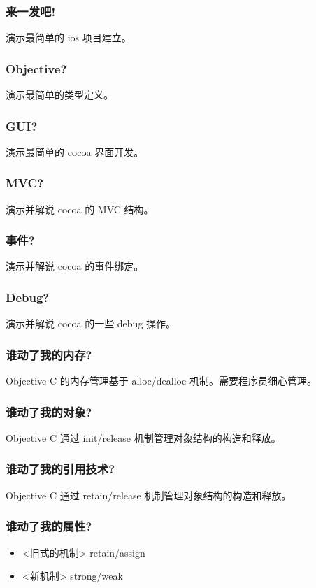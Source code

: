 \documentclass[utf8x, notes=hide]{beamer}
\begin{document}
\begin{frame}
  \frametitle{来一发吧!}
演示最简单的 ios 项目建立。
\end{frame}

\begin{frame}
  \frametitle{Objective?}
演示最简单的类型定义。
\end{frame}

\begin{frame}
  \frametitle{GUI?}
演示最简单的 cocoa 界面开发。
\end{frame}

\begin{frame}
  \frametitle{MVC?}
演示并解说 cocoa 的 MVC 结构。
\end{frame}

\begin{frame}
  \frametitle{事件?}
演示并解说 cocoa 的事件绑定。
\end{frame}

\begin{frame}
  \frametitle{Debug?}
演示并解说 cocoa 的一些 debug 操作。
\end{frame}

\begin{frame}
  \frametitle{谁动了我的内存?}
Objective C 的内存管理基于 alloc/dealloc 机制。需要程序员细心管理。
\end{frame}

\begin{frame}
  \frametitle{谁动了我的对象?}
Objective C 通过 init/release 机制管理对象结构的构造和释放。
\end{frame}

\begin{frame}
  \frametitle{谁动了我的引用技术?}
Objective C 通过 retain/release 机制管理对象结构的构造和释放。
\end{frame}

\begin{frame}
  \frametitle{谁动了我的属性?}
  \begin{itemize}
  \item<旧式的机制> retain/assign
  \item<新机制> strong/weak
  \end{itemize}
\end{frame}
\end{document}
